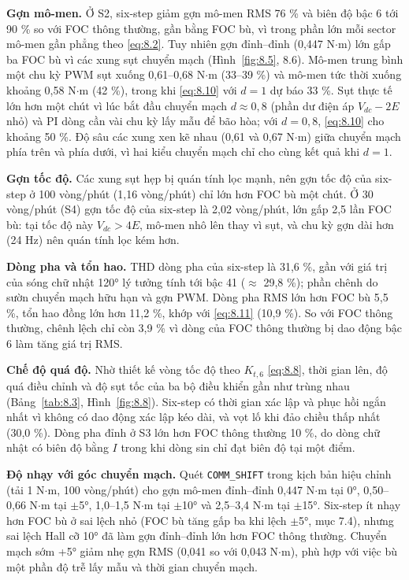 \textbf{Gợn mô-men.} Ở S2, six-step giảm gợn mô-men RMS 76 \% và biên độ bậc 6 tới 90 \% so với FOC thông thường, gần bằng FOC bù, vì trong phần lớn mỗi sector mô-men gần phẳng theo \eqref{eq:8.2}. Tuy nhiên gợn đỉnh–đỉnh (0,447 N$\cdot$m) lớn gấp ba FOC bù vì các xung sụt chuyển mạch (Hình~\ref{fig:8.5}, 8.6). Mô-men trung bình một chu kỳ PWM sụt xuống 0,61–0,68 N$\cdot$m (33–39 \%) và mô-men tức thời xuống khoảng 0,58 N$\cdot$m (42 \%), trong khi \eqref{eq:8.10} với $d = 1$ dự báo 33 \%. Sụt thực tế lớn hơn một chút vì lúc bắt đầu chuyển mạch $d \approx 0{,}8$ (phần dư điện áp $V_{dc} - 2E$ nhỏ) và PI dòng cần vài chu kỳ lấy mẫu để bão hòa; với $d = 0{,}8$, \eqref{eq:8.10} cho khoảng 50 \%. Độ sâu các xung xen kẽ nhau (0,61 và 0,67 N$\cdot$m) giữa chuyển mạch phía trên và phía dưới, vì hai kiểu chuyển mạch chỉ cho cùng kết quả khi $d = 1$.

\textbf{Gợn tốc độ.} Các xung sụt hẹp bị quán tính lọc mạnh, nên gợn tốc độ của six-step ở 100 vòng/phút (1,16 vòng/phút) chỉ lớn hơn FOC bù một chút. Ở 30 vòng/phút (S4) gợn tốc độ của six-step là 2,02 vòng/phút, lớn gấp 2,5 lần FOC bù: tại tốc độ này $V_{dc} > 4E$, mô-men nhô lên thay vì sụt, và chu kỳ gợn dài hơn (24 Hz) nên quán tính lọc kém hơn.

\textbf{Dòng pha và tổn hao.} THD dòng pha của six-step là 31,6 \%, gần với giá trị của sóng chữ nhật 120° lý tưởng tính tới bậc 41 ($\approx$ 29,8 \%); phần chênh do sườn chuyển mạch hữu hạn và gợn PWM. Dòng pha RMS lớn hơn FOC bù 5,5 \%, tổn hao đồng lớn hơn 11,2 \%, khớp với \eqref{eq:8.11} (10,9 \%). So với FOC thông thường, chênh lệch chỉ còn 3,9 \% vì dòng của FOC thông thường bị dao động bậc 6 làm tăng giá trị RMS.

\textbf{Chế độ quá độ.} Nhờ thiết kế vòng tốc độ theo $K_{t,6}$ \eqref{eq:8.8}, thời gian lên, độ quá điều chỉnh và độ sụt tốc của ba bộ điều khiển gần như trùng nhau (Bảng~\ref{tab:8.3}, Hình~\ref{fig:8.8}). Six-step có thời gian xác lập và phục hồi ngắn nhất vì không có dao động xác lập kéo dài, và vọt lố khi đảo chiều thấp nhất (30,0 \%). Dòng pha đỉnh ở S3 lớn hơn FOC thông thường 10 \%, do dòng chữ nhật có biên độ bằng $I$ trong khi dòng sin chỉ đạt biên độ tại một điểm.

\textbf{Độ nhạy với góc chuyển mạch.} Quét \texttt{COMM\_SHIFT} trong kịch bản hiệu chỉnh (tải 1 N$\cdot$m, 100 vòng/phút) cho gợn mô-men đỉnh–đỉnh 0,447 N$\cdot$m tại 0°, 0,50–0,66 N$\cdot$m tại $\pm$5°, 1,0–1,5 N$\cdot$m tại $\pm$10° và 2,5–3,4 N$\cdot$m tại $\pm$15°. Six-step ít nhạy hơn FOC bù ở sai lệch nhỏ (FOC bù tăng gấp ba khi lệch $\pm$5°, mục 7.4), nhưng sai lệch Hall cỡ 10° đã làm gợn đỉnh–đỉnh lớn hơn FOC thông thường. Chuyển mạch sớm +5° giảm nhẹ gợn RMS (0,041 so với 0,043 N$\cdot$m), phù hợp với việc bù một phần độ trễ lấy mẫu và thời gian chuyển mạch.

